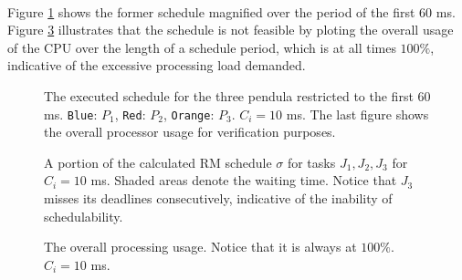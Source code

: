 \noindent{}\\


Figure \ref{fig:01.5.3.small} shows the former schedule magnified over the
period of the first 60 ms. Figure \ref{fig:01.5.4} illustrates that the schedule
is not feasible by ploting the overall usage of the CPU over the length of a
schedule period, which is at all times $100\%$, indicative of the excessive
processing load demanded.

\begin{sidewaysfigure}
  \begin{figure}[H]\centering
    \scalebox{1}{}
    \caption{The executed schedule for the three pendula restricted to the first
      60 ms. \texttt{Blue}: $P_1$, \texttt{Red}: $P_2$,
      \texttt{Orange}: $P_3$. $C_i = 10$ ms. The last figure shows the overall
      processor usage for verification purposes.}
  \label{fig:01.5.3.small}
  \end{figure}

  \begin{figure}[H]\centering
    \scalebox{0.7}{}
    \caption{A portion of the calculated RM schedule $\sigma$ for tasks
      $J_1, J_2, J_3$ for $C_i = 10$ ms.  Shaded areas denote the waiting time.
      Notice that $J_3$ misses its deadlines consecutively, indicative of the
      inability of schedulability.}
    \label{fig:rm_10}
  \end{figure}
\end{sidewaysfigure}

\begin{figure}[H]\centering
  \scalebox{0.7}{}
  \caption{The overall processing usage. Notice that it is always at $100\%$.
    $C_i = 10$ ms.}
    \label{fig:01.5.4}
\end{figure}
